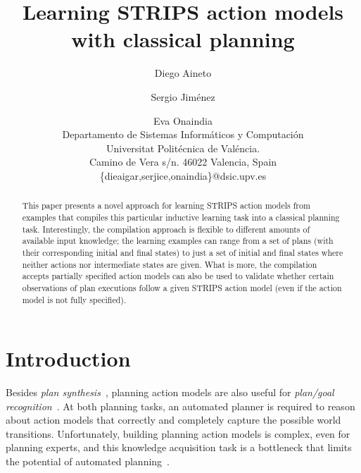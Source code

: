 \documentclass[letterpaper]{article} %
\begin{document}
\title{Learning STRIPS action models with classical planning}

\author{Diego Aineto\and Sergio Jim\'enez\and Eva Onaindia\\
{\small Departamento de Sistemas Inform\'aticos y Computaci\'on}\\
{\small Universitat Polit\'ecnica de Val\'encia.}\\
{\small Camino de Vera s/n. 46022 Valencia, Spain}\\
{\small \{dieaigar,serjice,onaindia\}@dsic.upv.es}}
 
\maketitle
\begin{abstract}
This paper presents a novel approach for learning STRIPS action models from examples that compiles this particular inductive learning task into a classical planning task. Interestingly, the compilation approach is flexible to different amounts of available input knowledge; the learning examples can range from a set of plans (with their corresponding initial and final states) to just a set of initial and final states where neither actions nor intermediate states are given. What is more, the compilation accepts partially specified action models can also be used to validate whether certain observations of plan executions follow a given STRIPS action model (even if the action model is not fully specified).
\end{abstract}


\section{Introduction}
Besides {\em plan synthesis}~\cite{ghallab2004automated,geffner:book:2013}, planning action models are also useful for {\em plan/goal recognition}~\cite{ramirez2012plan}. At both planning tasks, an automated planner is required to reason about action models that correctly and completely capture the possible world transitions. Unfortunately, building planning action models is complex, even for planning experts, and this knowledge acquisition task is a bottleneck that limits the potential of automated planning~\cite{kambhampati:modellite:AAAI2007}.  
\end{document}
